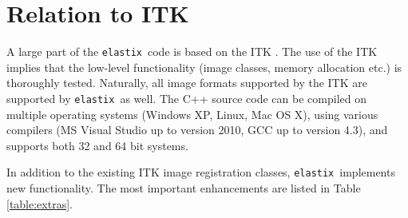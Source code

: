 \documentclass[]{report}
\newcommand{\elastix}{\texttt{elastix}}
\begin{document}
\section{Relation to ITK}

%
%

A large part of the \elastix\ code is based on the ITK
\cite{ITKSoftwareGuideSecondEdition}. The use of the ITK implies that the
low-level functionality (image classes, memory allocation etc.) is thoroughly
tested. Naturally, all image formats supported by the ITK are supported by
\elastix\ as well. The C++ source code can be compiled on multiple operating
systems (Windows XP, Linux, Mac OS X), using various compilers (MS Visual
Studio up to version 2010, GCC up to version 4.3), and supports both 32 and 64
bit systems.

In addition to the existing ITK image registration classes, \elastix\
implements new functionality. The most important enhancements are listed in
Table \ref{table:extras}.
\end{document}

